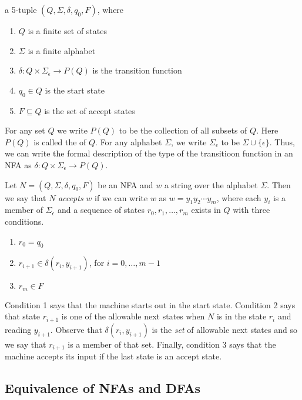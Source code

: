 \documentclass{article}
\begin{document}
\begin{definition} 
 a 5-tuple $(Q,\Sigma,\delta,q_0,F)$, where
  \begin{enumerate}
    \item $Q$ is a finite set of states 
    \item $\Sigma$ is a finite alphabet 
    \item $\delta: Q \times \Sigma_{\epsilon} \rightarrow P(Q)$ is the transition function 
    \item $q_0 \in Q$ is the start state 
    \item $F \subseteq Q$ is the set of accept states
  \end{enumerate}
  For any set $Q$ we write $P(Q)$ to be the collection of all subsets of $Q$. Here $P(Q)$ is called the  of $Q$. For any alphabet $\Sigma$, we write $\Sigma_{\epsilon}$ to be $\Sigma \cup \{\epsilon\}$. Thus, we can write the formal description of the type of the transitioon function in an NFA as $\delta: Q \times \Sigma_{\epsilon} \rightarrow P(Q)$. 
\end{definition}

\begin{definition}
  Let $N=(Q,\Sigma,\delta,q_0,F)$ be an NFA and $w$ a string over the alphabet $\Sigma$. Then we say that $N$ \emph{accepts} $w$ if we can write $w$ as $w = y_{1}y_{2}\cdots y_{m}$, where each $y_i$ is a member of $\Sigma_{\epsilon}$ and a sequence of states $r_0 , r_1 , \dots , r_{m}$ exists in $Q$ with three conditions.  \\ 
  \begin{enumerate}
    \item $r_0 = q_0$ 
    \item $r_{i + 1} \in \delta(r_{i}, y_{i+1})$, for $i = 0, \dots , m-1$ 
    \item $r_m \in F$
  \end{enumerate}
  Condition 1 says that the machine starts out in the start state. Condition 2 says that state $r_{i+1}$ is one of the allowable next states when $N$ is in the state $r_i$ and reading $y_{i+1}$. Observe that $\delta(r_{i},y_{i+1})$ is the \emph{set} of allowable next states and so we say that $r_{i+1}$ is a member of that set. Finally, condition 3 says that the machine accepts its input if the last state is an accept state. 
\end{definition}

\subsection{Equivalence of NFAs and DFAs}
\end{document}
